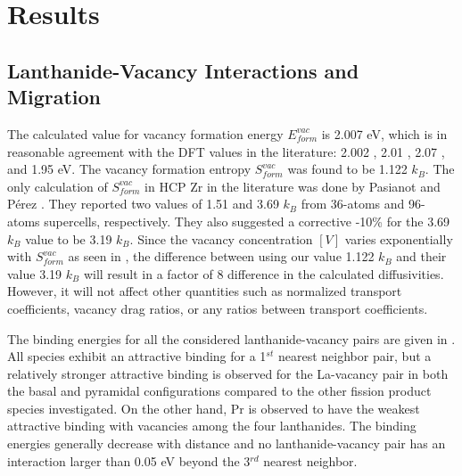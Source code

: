 \documentclass[preprint,12pt]{elsarticle}
\begin{document}
\FloatBarrier

\section{Results}
\label{results}

\subsection{Lanthanide-Vacancy Interactions and Migration}
\label{lanthanide_vac_inter}

The calculated value for vacancy formation energy $E_{form}^{vac}$ is 2.007 eV, which is in reasonable agreement with the DFT values in the literature: 2.002 \cite{jain_first-principles_2019}, 2.01 \cite{lu_first-principles_2018}, 2.07 \cite{varvenne_vacancy_2014}, and 1.95 \cite{pasianot_issues_2012} eV. The vacancy formation entropy $S_{form}^{vac}$ was found to be 1.122 $k_B$. The only calculation of $S_{form}^{vac}$ in HCP Zr in the literature was done by Pasianot and P\'erez \cite{pasianot_issues_2012}. They reported two values of 1.51 and 3.69 $k_B$ from 36-atoms and 96-atoms supercells, respectively. They also suggested a corrective -10\% for the 3.69 $k_B$ value to be 3.19 $k_B$. Since the vacancy concentration $[V]$ varies exponentially with $S_{form}^{vac}$ as seen in , the difference between using our value 1.122 $k_B$ and their value 3.19 $k_B$ \cite{pasianot_issues_2012} will result in a factor of 8 difference in the calculated diffusivities. However, it will not affect other quantities such as normalized transport coefficients, vacancy drag ratios, or any ratios between transport coefficients. 

The binding energies for all the considered lanthanide-vacancy pairs are given in . All species exhibit an attractive binding for a 1$^{st}$ nearest neighbor pair, but a relatively stronger attractive binding is observed for the La-vacancy pair in both the basal and pyramidal configurations compared to the other fission product species investigated. 
On the other hand, Pr is observed to have the weakest attractive binding with vacancies among the four lanthanides. The binding energies generally decrease with distance and no lanthanide-vacancy pair has an interaction larger than 0.05 eV beyond the 3$^{rd}$ nearest neighbor. 
\end{document}
